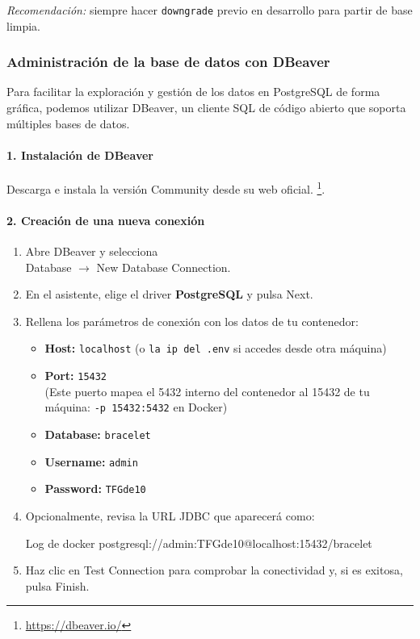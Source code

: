 \documentclass[12pt, a4paper]{article}
\begin{document}
\begin{umaappendices}
	\noindent
	\emph{Recomendación:} siempre hacer \texttt{downgrade} previo en desarrollo para partir de base limpia.
	
	\subsubsection{Administración de la base de datos con DBeaver}
	\label{sec:dbeaver_admin}
	
	Para facilitar la exploración y gestión de los datos en PostgreSQL de forma gráfica, podemos utilizar DBeaver, un cliente SQL de código abierto que soporta múltiples bases de datos.
	
	\paragraph{1. Instalación de DBeaver}  
	Descarga e instala la versión Community desde su web oficial. \footnote{\url{https://dbeaver.io/}}.  
	
	\paragraph{2. Creación de una nueva conexión}  
	\begin{enumerate}
		\item Abre DBeaver y selecciona \\[4pt]
		\hspace*{1em}\textsf{Database} \(\to\) \textsf{New Database Connection}.
		\item En el asistente, elige el driver \textbf{PostgreSQL} y pulsa \textsf{Next}.
		\item Rellena los parámetros de conexión con los datos de tu contenedor:
		\begin{itemize}
			\item \textbf{Host:} \texttt{localhost} (o \texttt{la ip del .env} si accedes desde otra máquina)
			\item \textbf{Port:} \texttt{15432}\\
			(Este puerto mapea el 5432 interno del contenedor al 15432 de tu máquina: \texttt{-p 15432:5432} en Docker)
			\item \textbf{Database:} \texttt{bracelet}
			\item \textbf{Username:} \texttt{admin}
			\item \textbf{Password:} \texttt{TFGde10}
		\end{itemize}
		\item Opcionalmente, revisa la URL JDBC que aparecerá como:
		\begin{Terminal}{Log de docker}
			postgresql://admin:TFGde10@localhost:15432/bracelet
		\end{Terminal}
		\item Haz clic en \textsf{Test Connection} para comprobar la conectividad y, si es exitosa, pulsa \textsf{Finish}.
	\end{enumerate}
	

\end{umaappendices}
\end{document}
